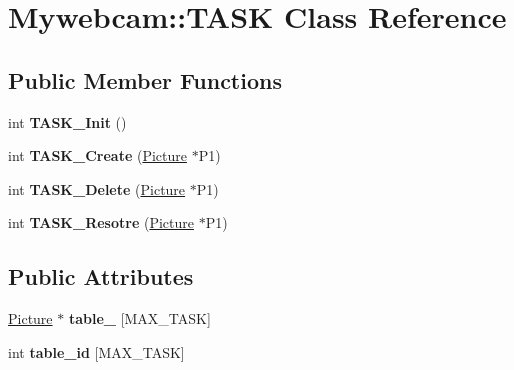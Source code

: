 \hypertarget{class_mywebcam_1_1_t_a_s_k}{}\section{Mywebcam\+:\+:T\+A\+SK Class Reference}
\label{class_mywebcam_1_1_t_a_s_k}
\subsection*{Public Member Functions}
\begin{DoxyCompactItemize}
\item 
\mbox{\label{class_mywebcam_1_1_t_a_s_k_a17fcbbd7f9f76f4618764db8776e654f}} 
int {\bfseries T\+A\+S\+K\+\_\+\+Init} ()
\item 
\mbox{\label{class_mywebcam_1_1_t_a_s_k_a4d818571de0342e9c86d9bc86b11c4f2}} 
int {\bfseries T\+A\+S\+K\+\_\+\+Create} (\hyperlink{class_mywebcam_1_1_picture}{Picture} $\ast$P1)
\item 
\mbox{\label{class_mywebcam_1_1_t_a_s_k_a58464268db362fc082201cdec0791d2b}} 
int {\bfseries T\+A\+S\+K\+\_\+\+Delete} (\hyperlink{class_mywebcam_1_1_picture}{Picture} $\ast$P1)
\item 
\mbox{\label{class_mywebcam_1_1_t_a_s_k_a2ce2a35f4763df6d1786febde820bf16}} 
int {\bfseries T\+A\+S\+K\+\_\+\+Resotre} (\hyperlink{class_mywebcam_1_1_picture}{Picture} $\ast$P1)
\end{DoxyCompactItemize}
\subsection*{Public Attributes}
\begin{DoxyCompactItemize}
\item 
\mbox{\label{class_mywebcam_1_1_t_a_s_k_a740c2bea4125da2ab9224d522144fc4a}} 
\hyperlink{class_mywebcam_1_1_picture}{Picture} $\ast$ {\bfseries table\+\_} \mbox{[}M\+A\+X\+\_\+\+T\+A\+SK\mbox{]}
\item 
\mbox{\label{class_mywebcam_1_1_t_a_s_k_a8156e099c556976338db7fe9084ffba4}} 
int {\bfseries table\+\_\+id} \mbox{[}M\+A\+X\+\_\+\+T\+A\+SK\mbox{]}
\end{DoxyCompactItemize}
